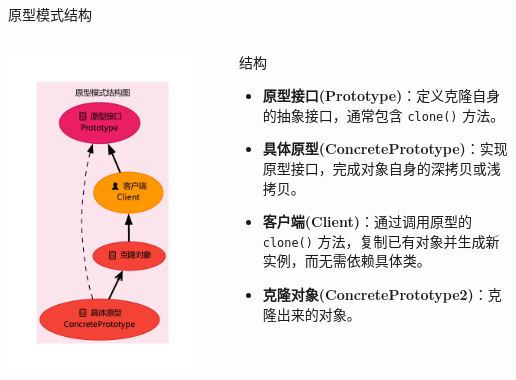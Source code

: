 \documentclass[UTF8,aspectratio=169]{beamer}
\begin{document}
\begin{frame}{原型模式结构}
    \begin{columns}
        \begin{column}{0.38\textwidth}
            \includegraphics[width=0.9\textwidth]{images/prototype_pattern.pdf}
        \end{column}
        \begin{column}{0.58\textwidth}
            \begin{ytublock}{结构}
                \begin{itemize}
                    \item \textbf{原型接口(Prototype)}：定义克隆自身的抽象接口，通常包含 \texttt{clone()} 方法。
                    \item \textbf{具体原型(ConcretePrototype)}：实现原型接口，完成对象自身的深拷贝或浅拷贝。
                    \item \textbf{客户端(Client)}：通过调用原型的 \texttt{clone()} 方法，复制已有对象并生成新实例，而无需依赖具体类。
                    \item \textbf{克隆对象(ConcretePrototype2)}：克隆出来的对象。
                \end{itemize}
            \end{ytublock}
        \end{column}
    \end{columns}
\end{frame}
\end{document}
